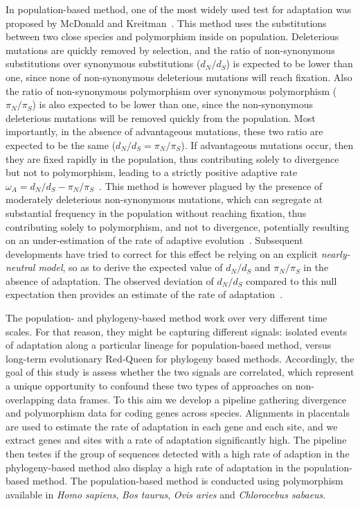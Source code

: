 \documentclass{article}
\newcommand{\dn}{d_N}
\newcommand{\ds}{d_S}
\newcommand{\dnds}{\dn / \ds}
\newcommand{\pn}{\pi_N}
\newcommand{\ps}{\pi_S}
\newcommand{\pnps}{\pn / \ps}
\begin{document}
In population-based method, one of the most widely used test for adaptation was proposed by McDonald and Kreitman~\citep{mcdonald_adaptative_1991}.
This method uses the substitutions between two close species and polymorphism inside on population.
Deleterious mutations are quickly removed by selection, and the ratio of non-synonymous substitutions over synonymous substitutions ($\dnds$) is expected to be lower than one, since none of non-synonymous deleterious mutations will reach fixation.
Also the ratio of non-synonymous polymorphism over synonymous polymorphism ($\pnps$) is also expected to be lower than one, since the non-synonymous deleterious mutations will be removed quickly from the population.
Most importantly, in the absence of advantageous mutations, these two ratio are expected to be the same ($\dnds=\pnps$).
If advantageous mutations occur, then they are fixed rapidly in the population, thus contributing solely to divergence but not to polymorphism, leading to a strictly positive adaptive rate $\omega_A = \dnds-\pnps$~\citep{smith_adaptive_2002}.
This method is however plagued by the presence of moderately deleterious non-synonymous mutations, which can segregate at substantial frequency in the population without reaching fixation, thus contributing solely to polymorphism, and not to divergence, potentially resulting on an under-estimation of the rate of adaptive evolution~\citep{eyre-walker_quantifying_2002}.
Subsequent developments have tried to correct for this effect be relying on an explicit \textit{nearly-neutral model}, so as to derive the expected value of $\dnds$ and $\pnps$ in the absence of adaptation.
The observed deviation of $\dnds$ compared to this null expectation then provides an estimate of the rate of adaptation~\citep{eyre-walker_estimating_2009, galtier_adaptive_2016}.

The population- and phylogeny-based method work over very different time scales.
For that reason, they might be capturing different signals: isolated events of adaptation along a particular lineage for population-based method, versus long-term evolutionary Red-Queen for phylogeny based methods.
Accordingly, the goal of this study is assess whether the two signals are correlated, which represent a unique opportunity to confound these two types of approaches on non-overlapping data frames.
To this aim we develop a pipeline gathering divergence and polymorphism data for coding genes across species.
Alignments in placentals are used to estimate the rate of adaptation in each gene and each site, and we extract genes and sites with a rate of adaptation significantly high.
The pipeline then testes if the group of sequences detected with a high rate of adaption in the phylogeny-based method also display a high rate of adaptation in the population-based method.
The population-based method is conducted using polymorphism available in \textit{Homo sapiens}, \textit{Bos taurus}, \textit{Ovis aries} and \textit{Chlorocebus sabaeus}.
\end{document}

